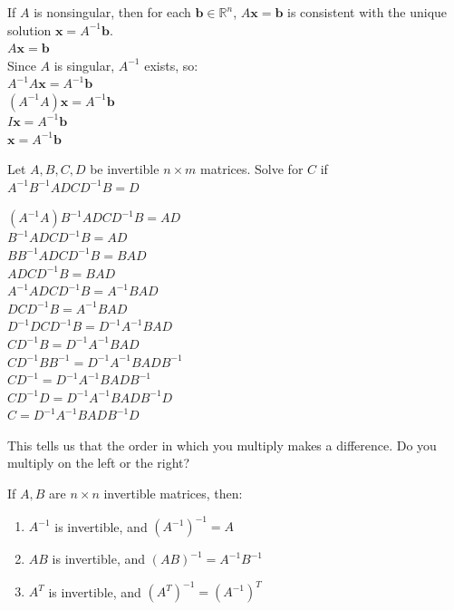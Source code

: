 \documentclass{report}
\begin{document}
\begin{theorem}
If $A$ is nonsingular, then for each $\mathbf{b}\in\mathbb{R}^n$, $A\mathbf{x}=\mathbf{b}$ is consistent with the unique solution $\mathbf{x}=A^{-1}\mathbf{b}$.\\
$A\mathbf{x}=\mathbf{b}$\\
Since $A$ is singular, $A^{-1}$ exists, so:\\
$A^{-1}A\mathbf{x}=A^{-1}\mathbf{b}$\\
$(A^{-1}A)\mathbf{x}=A^{-1}\mathbf{b}$\\
$I\mathbf{x}=A^{-1}\mathbf{b}$\\
$\mathbf{x}=A^{-1}\mathbf{b}$\\
\end{theorem}

\begin{example}
Let $A, B, C, D$ be invertible $n\times m$ matrices. Solve for $C$ if \\$A^{-1}B^{-1}ADCD^{-1}B=D$
\begin{center}
	$(A^{-1}A)B^{-1}ADCD^{-1}B=AD$\\
	$B^{-1}ADCD^{-1}B=AD$\\
	$BB^{-1}ADCD^{-1}B=BAD$\\
	$ADCD^{-1}B=BAD$\\
	$A^{-1}ADCD^{-1}B=A^{-1}BAD$\\
	$DCD^{-1}B=A^{-1}BAD$\\
	$D^{-1}DCD^{-1}B=D^{-1}A^{-1}BAD$\\
	$CD^{-1}B=D^{-1}A^{-1}BAD$\\
	$CD^{-1}BB^{-1}=D^{-1}A^{-1}BADB^{-1}$\\
	$CD^{-1}=D^{-1}A^{-1}BADB^{-1}$\\
	$CD^{-1}D=D^{-1}A^{-1}BADB^{-1}D$\\
	$C=D^{-1}A^{-1}BADB^{-1}D$\\	
\end{center}
\end{example}

This tells us that the order in which you multiply makes a difference. Do you multiply on the left or the right?

\begin{theorem}
If $A, B$ are $n\times n$ invertible matrices, then:
\begin{enumerate}
	\item $A^{-1}$ is invertible, and $(A^{-1})^{-1}=A$
	\item $AB$ is invertible, and $(AB)^{-1}=A^{-1}B^{-1}$
	\item $A^{T}$ is invertible, and $(A^{T})^{-1}=(A^{-1})^T$
\end{enumerate}
\end{theorem}
\end{document}
